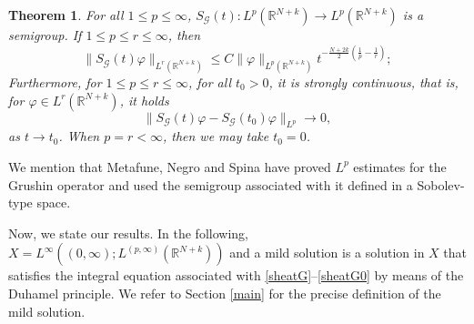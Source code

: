 \documentclass[12pt]{amsart}
\newtheorem{thmx}{Theorem}
\newcommand{\R}{\mathbb{R}}
\begin{document}
\begin{thmx}\label{lpest}
	For all $1\leq p \leq \infty$, $S_\mathcal{G}(t):L^p(\R^{N+k})\rightarrow L^p(\R^{N+k})$ is a semigroup. If $1\leq p \leq r\leq\infty$, then
	\begin{equation}\label{semigroup}
		\|S_\mathcal{G}(t)\varphi\|_{L^r(\R^{N+k})}\leq C\|\varphi\|_{L^p(\R^{N+k})}t^{-\frac{N+2k}{2}\left(\frac{1}{p}-\frac{1}{r}\right)};
	\end{equation}
	Furthermore, for $1 \leq p \leq r \leq \infty$, for all $t_0>0$, it is strongly continuous, that is, for $\varphi \in L^r(\R^{N+k})$, it holds
	\begin{equation}\label{continuidadeforte} 
		\|S_\mathcal{G}(t)\varphi-S_\mathcal{G}(t_0)\varphi\|_{L^p}\rightarrow 0,
	\end{equation}
	as $t\rightarrow t_0$. When $p=r<\infty$, then we may take $t_0=0$.
\end{thmx}

We mention that Metafune, Negro and Spina \cite{Me-Ne-Sp-20} have proved $L^p$ estimates for the Grushin operator and used the semigroup associated with it defined in a Sobolev-type space.


Now, we state our results. In the following, $X = L^\infty((0,\infty);L^{(p,\infty)}(\R^{N+k}))$ and a mild solution is a solution in $X$ that satisfies the integral equation associated with \eqref{sheatG}--\eqref{sheatG0} by means of the Duhamel principle. We refer to  Section \ref{main} for the precise definition of the mild solution. 
\end{document}
